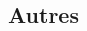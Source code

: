\documentclass[resume]{subfiles}
\begin{document}
\begin{multicols}{3}
\section{Autres}

\end{multicols}
\end{document}
